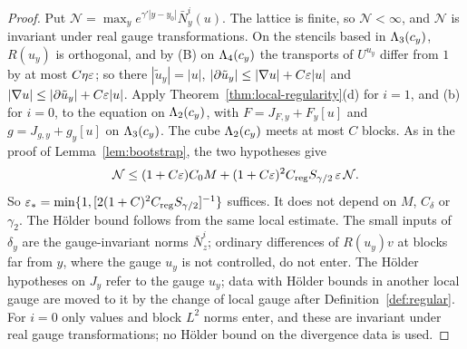 \begin{proof}
Put $\mathcal N=\max_ye^{\gamma'|y-y_0|}\bar N^i_y(u)$. The lattice is finite, so $\mathcal N<\infty$, and $\mathcal N$ is invariant under real gauge transformations. On the stencils based in $\Lambda_3(c_y)$, $R(u_y)$ is orthogonal, and by (B) on $\Lambda_4(c_y)$ the transports of $U^{u_y}$ differ from $1$ by at most $C\eta\varepsilon$; so there $|\tilde u_y|=|u|$, $|\partial\tilde u_y|\le|\nabla u|+C\varepsilon|u|$ and $|\nabla u|\le|\partial\tilde u_y|+C\varepsilon|u|$. Apply Theorem~\ref{thm:local-regularity}(d) for $i=1$, and (b) for $i=0$, to the equation on $\Lambda_2(c_y)$, with $F=J_{F,y}+F_y[u]$ and $g=J_{g,y}+g_y[u]$ on $\Lambda_3(c_y)$. The cube $\Lambda_2(c_y)$ meets at most $C$ blocks. As in the proof of Lemma~\ref{lem:bootstrap}, the two hypotheses give
\[
\mathcal N\le(1+C\varepsilon)C_0M+(1+C\varepsilon)^2C_{\rm reg}S_{\gamma/2}\,\varepsilon\,\mathcal N .
\]
So $\varepsilon_*=\min\{1,[2(1+C)^2C_{\rm reg}S_{\gamma/2}]^{-1}\}$ suffices. It does not depend on $M$, $C_\delta$ or $\gamma_2$. The H\"older bound follows from the same local estimate. The small inputs of $\delta_y$ are the gauge-invariant norms $\bar N^i_z$; ordinary differences of $R(u_y)v$ at blocks far from $y$, where the gauge $u_y$ is not controlled, do not enter. The H\"older hypotheses on $J_y$ refer to the gauge $u_y$; data with H\"older bounds in another local gauge are moved to it by the change of local gauge after Definition~\ref{def:regular}. For $i=0$ only values and block $L^2$ norms enter, and these are invariant under real gauge transformations; no H\"older bound on the divergence data is used.
\end{proof}
